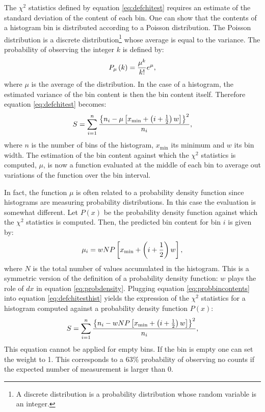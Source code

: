 The $\chi^2$ statistics defined by equation \ref{eq:defchitest}
requires an estimate of the standard deviation of the content of
each bin. One can show that the contents of a histogram bin is
distributed according to a Poisson distribution. The Poisson
distribution is a discrete distribution\footnote{A discrete
distribution is a probability distribution whose random variable
is an integer.} whose average is equal to the variance. The
probability of observing the integer $k$ is defined by:
\begin{equation}
 P_{\mu}\left(k\right)= {\mu^k\over k!}e^{\mu},
\end{equation}
where $\mu$ is the average of the distribution. In the case of a
histogram, the estimated variance of the bin content is then the
bin content itself. Therefore equation \ref{eq:defchitest}
becomes:
\begin{equation}
\label{eq:defchitesthist}
  S=\sum_{i=1}^n
  { \left\{n_i - \mu\left[x_{\min} + \left(i+{1\over 2} \right)w\right]\right\}^2 \over
  n_i},
\end{equation}
where $n$ is the number of bins of the histogram, $x_{\min}$ its
minimum and $w$ its bin width. The estimation of the bin content
against which the $\chi^2$ statistics is computed, $\mu$, is now a
function evaluated at the middle of each bin to average out
variations of the function over the bin interval.

In fact, the function $\mu$ is often related to a probability
density function since histograms are measuring probability
distributions. In this case the evaluation is somewhat different.
Let $P\left(x\right)$ be the probability density function against
which the $\chi^2$ statistics is computed. Then, the predicted bin
content for bin $i$ is given by:
\begin{equation}
\label{eq:probbincontents}
 \mu_i = wNP\left[x_{\min} + \left(i+{1\over 2} \right)w\right],
\end{equation}
where $N$ is the total number of values accumulated in the
histogram. This is a symmetric version of the definition of a
probability density function: $w$ plays the role of $dx$ in
equation \ref{eq:probdensity}. Plugging equation
\ref{eq:probbincontents} into equation \ref{eq:defchitesthist}
yields the expression of the $\chi^2$ statistics for a histogram
computed against a probability density function $P\left(x\right)$:
\begin{equation}
\label{eq:defchitesthistprob}
  S=\sum_{i=1}^n
  { \left\{n_i - wNP\left[x_{\min} + \left(i+{1\over 2} \right)w\right]\right\}^2 \over
  n_i},
\end{equation}
This equation cannot be applied for empty bins. If the bin is
empty one can set the weight to 1. This corresponds to a $63\%$
probability of observing no counts if the expected number of
measurement is larger than 0.

